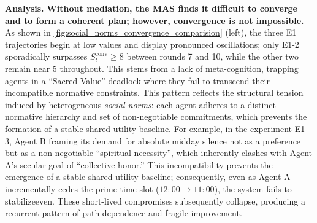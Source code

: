 \documentclass[11pt, letterpaper, shortlabels]{berkeley}
\begin{document}
{\begin{figure}[h]
  \label{fig:social_norms_convergence_comparision}
\end{figure}

\textbf{Analysis.}
\textbf{Without mediation, the MAS finds it difficult to converge and to form a coherent plan; however, convergence is not impossible.} As shown in \autoref{fig:social_norms_convergence_comparision} (left), the three E1 trajectories begin at low values and display pronounced oscillations; only E1-2 sporadically surpasses $S_t^{\mathrm{conv}}\ge8$ between rounds 7 and 10, while the other two remain near 5 throughout. This stems from a lack of meta-cognition, trapping agents in a ``Sacred Value'' deadlock where they fail to transcend their incompatible normative constraints.
This pattern reflects the structural tension induced by heterogeneous \emph{social norms}: each agent adheres to a distinct normative hierarchy and set of non-negotiable commitments, which prevents the formation of a stable shared utility baseline. For example, in the experiment E1-3, Agent B framing its demand for absolute midday silence not as a preference but as a non-negotiable ``spiritual necessity'', which inherently clashes with Agent A's secular goal of ``collective honor.'' This incompatibility prevents the emergence of a stable shared utility baseline; consequently, even as Agent A incrementally cedes the prime time slot ($12:00 \to 11:00$), the system fails to stabilizeeven. These short-lived compromises subsequently collapse, producing a recurrent pattern of path dependence and fragile improvement.


}
\end{document}
